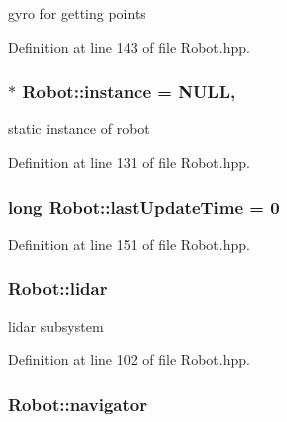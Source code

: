 gyro for getting points 



Definition at line 143 of file Robot.\-hpp.

\hypertarget{classRobot_aad5c5d6db601aac62393d47ec9385fa3}{
\subsubsection[{instance}]{ $\ast$ Robot\-::instance = N\-U\-L\-L\hspace{0.3cm}{\ttfamily [static]}, {\ttfamily [private]}}}\label{classRobot_aad5c5d6db601aac62393d47ec9385fa3}


static instance of robot 



Definition at line 131 of file Robot.\-hpp.

\hypertarget{classRobot_a82a33c66efce935d2cac37c9f11c6efd}{
\subsubsection[{last\-Update\-Time}]{\setlength{\rightskip}{0pt plus 5cm}long Robot\-::last\-Update\-Time = 0\hspace{0.3cm}{\ttfamily [private]}}}\label{classRobot_a82a33c66efce935d2cac37c9f11c6efd}


Definition at line 151 of file Robot.\-hpp.

\hypertarget{classRobot_a222e54f477e23f5af80cfa10bcd85e7a}{
\subsubsection[{lidar}]{ Robot\-::lidar}}\label{classRobot_a222e54f477e23f5af80cfa10bcd85e7a}


lidar subsystem 



Definition at line 102 of file Robot.\-hpp.

\hypertarget{classRobot_a71e296a4f32c3a81b5a9fabeac12747b}{
\subsubsection[{navigator}]{ Robot\-::navigator}}\label{classRobot_a71e296a4f32c3a81b5a9fabeac12747b}



